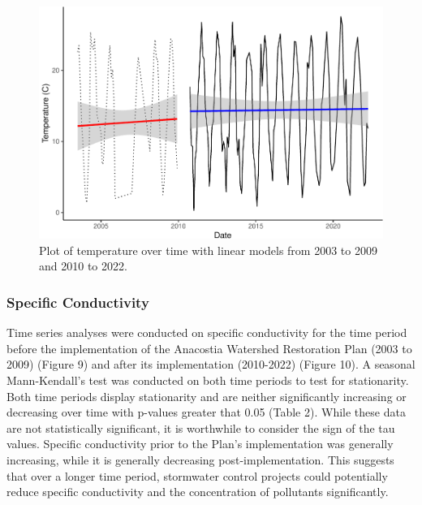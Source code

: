 \documentclass[
  12pt,
]{article}
\begin{document}
\newpage

\begin{figure}

{\centering \includegraphics{Project_Template_files/figure-latex/Plot of Temperature over time with LMs-1} 

}

\caption{Plot of temperature over time with linear models from 2003 to 2009 and 2010 to 2022.}\label{fig:Plot of Temperature over time with LMs}
\end{figure}

\newpage

\hypertarget{specific-conductivity}{%
\subsubsection{Specific Conductivity}\label{specific-conductivity}}

Time series analyses were conducted on specific conductivity for the
time period before the implementation of the Anacostia Watershed
Restoration Plan (2003 to 2009) (Figure 9) and after its implementation
(2010-2022) (Figure 10). A seasonal Mann-Kendall's test was conducted on
both time periods to test for stationarity. Both time periods display
stationarity and are neither significantly increasing or decreasing over
time with p-values greater that 0.05 (Table 2). While these data are not
statistically significant, it is worthwhile to consider the sign of the
tau values. Specific conductivity prior to the Plan's implementation was
generally increasing, while it is generally decreasing
post-implementation. This suggests that over a longer time period,
stormwater control projects could potentially reduce specific
conductivity and the concentration of pollutants significantly.
\end{document}

